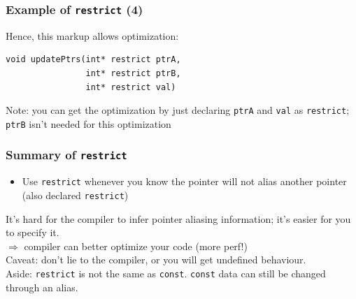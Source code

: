 \begin{frame}[fragile]
  \frametitle{Example of {\tt restrict} (4)}
  
  Hence, this markup allows optimization:
  \begin{lstlisting}
void updatePtrs(int* restrict ptrA, 
                int* restrict ptrB,
                int* restrict val)
  \end{lstlisting}
  Note: you can get the optimization by just declaring {\tt ptrA} and
      {\tt val} as {\tt restrict}; {\tt ptrB} isn't needed for this optimization
  
\end{frame}

\begin{frame}[fragile]
  \frametitle{Summary of {\tt restrict}}

  
  \begin{itemize}
    \item Use {\tt restrict} whenever you know the pointer will not alias
      another pointer (also declared {\tt restrict})
  \end{itemize}

    It's hard for the compiler to infer pointer aliasing information;
    it's easier for you to specify it.\\[1em]

    $\Rightarrow$ compiler can better optimize your code (more perf!)\\[1em]

    Caveat: don't lie to the compiler, or  you will get
      \alert{undefined behaviour}.\\[1em]

    Aside: {\tt restrict} is not the same as {\tt const}. {\tt const} data can still be
      changed through an alias.
  
\end{frame}





